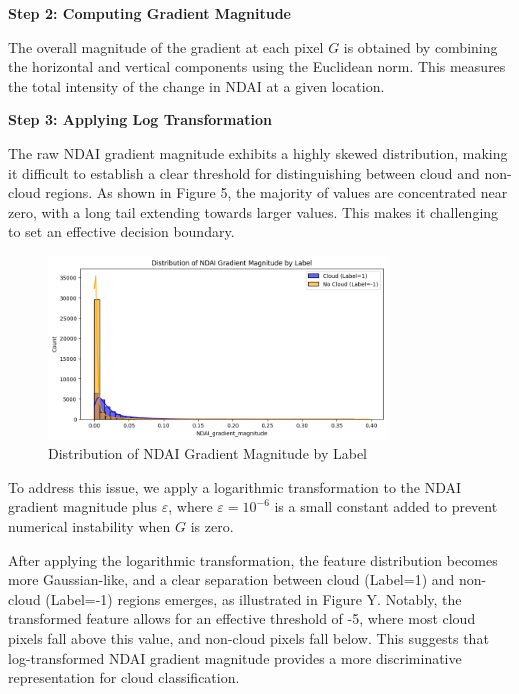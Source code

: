 \documentclass[10pt,letterpaper]{article}
\begin{document}
\textbf{Step 2: Computing Gradient Magnitude}  

The overall magnitude of the gradient at each pixel \( G \) is obtained by combining the horizontal and vertical components using the Euclidean norm. This measures the total intensity of the change in NDAI at a given location.

\textbf{Step 3: Applying Log Transformation}  

The raw NDAI gradient magnitude exhibits a highly skewed distribution, making it difficult to establish a clear threshold for distinguishing between cloud and non-cloud regions. As shown in Figure 5, the majority of values are concentrated near zero, with a long tail extending towards larger values. This makes it challenging to set an effective decision boundary.

\begin{figure}[H]
    \centering
    \includegraphics[width=0.8\textwidth]{dist_of_NDAI_grad.png}
    \caption{Distribution of NDAI Gradient Magnitude by Label}
    \label{Figure 5}
\end{figure}

To address this issue, we apply a logarithmic transformation to the NDAI gradient magnitude plus \( \varepsilon  \), where \( \varepsilon = 10^{-6} \) is a small constant added to prevent numerical instability when \( G \) is zero.

After applying the logarithmic transformation, the feature distribution becomes more Gaussian-like, and a clear separation between cloud (Label=1) and non-cloud (Label=-1) regions emerges, as illustrated in Figure Y. Notably, the transformed feature allows for an effective threshold of -5, where most cloud pixels fall above this value, and non-cloud pixels fall below. This suggests that log-transformed NDAI gradient magnitude provides a more discriminative representation for cloud classification.
\end{document}
